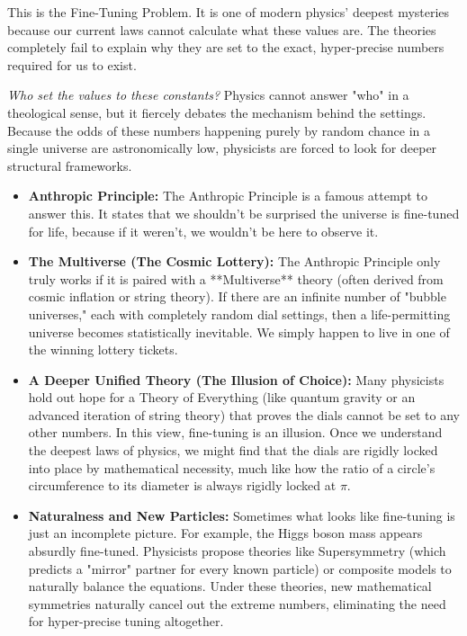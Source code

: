 This is the Fine-Tuning Problem. It is one of modern physics' deepest mysteries because our current laws cannot calculate what these values are.
The theories completely fail to explain why they are set to the exact, hyper-precise numbers required for us to exist.

\textit{Who set the values to these constants?} Physics cannot answer "who" in a theological sense, but it fiercely debates the mechanism behind the settings.
Because the odds of these numbers happening purely by random chance in a single universe are astronomically low, physicists are forced to look for deeper structural frameworks.

\begin{itemize}
\item \textbf{Anthropic Principle:} The Anthropic Principle is a famous attempt to answer this.
  It states that we shouldn't be surprised the universe is fine-tuned for life, because if it weren't, we wouldn't be here to observe it.
\item \textbf{The Multiverse (The Cosmic Lottery):} The Anthropic Principle only truly works if it is paired with a **Multiverse** theory (often derived from cosmic inflation or string theory).
  If there are an infinite number of "bubble universes," each with completely random dial settings, then a life-permitting universe becomes statistically inevitable.
  We simply happen to live in one of the winning lottery tickets.
\item \textbf{A Deeper Unified Theory (The Illusion of Choice):} Many physicists hold out hope for a Theory of Everything
  (like quantum gravity or an advanced iteration of string theory) that proves the dials cannot be set to any other numbers.
  In this view, fine-tuning is an illusion. Once we understand the deepest laws of physics, we might find that the dials are rigidly
  locked into place by mathematical necessity, much like how the ratio of a circle's circumference to its diameter is always rigidly locked at $\pi$.
\item \textbf{Naturalness and New Particles:} Sometimes what looks like fine-tuning is just an incomplete picture.
  For example, the Higgs boson mass appears absurdly fine-tuned. Physicists propose theories like Supersymmetry (which predicts a "mirror"
  partner for every known particle) or composite models to naturally balance the equations.
  Under these theories, new mathematical symmetries naturally cancel out the extreme numbers, eliminating the need for hyper-precise tuning altogether.
\end{itemize}

